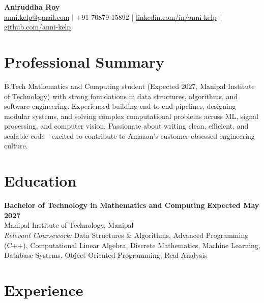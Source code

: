 \documentclass[a4paper,11pt]{article}
\begin{document}
\begin{center}
    {\Huge \textbf{Aniruddha Roy}} \\[5pt]
    \href{mailto:anni.kelp@gmail.com}{anni.kelp@gmail.com} \quad $|$ \quad
    +91 70879 15892 \quad $|$ \quad
    \href{https://www.linkedin.com/in/anni-kelp}{linkedin.com/in/anni-kelp} \quad $|$ \quad
    \href{https://github.com/anni-kelp}{github.com/anni-kelp}
\end{center}

\vspace{0.1cm}

\section{Professional Summary}
B.Tech Mathematics and Computing student (Expected 2027, Manipal Institute of Technology) with strong foundations in data structures, algorithms, and software engineering. Experienced building end-to-end pipelines, designing modular systems, and solving complex computational problems across ML, signal processing, and computer vision. Passionate about writing clean, efficient, and scalable code—excited to contribute to Amazon's customer-obsessed engineering culture.

\section{Education}
\textbf{Bachelor of Technology in Mathematics and Computing} \hfill \textbf{Expected May 2027} \\
Manipal Institute of Technology, Manipal \\
\textit{Relevant Coursework:} Data Structures \& Algorithms, Advanced Programming (C++), Computational Linear Algebra, Discrete Mathematics, Machine Learning, Database Systems, Object-Oriented Programming, Real Analysis

\section{Experience}
\end{document}
